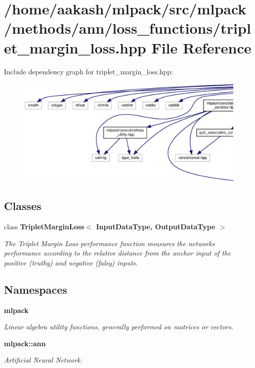 \section{/home/aakash/mlpack/src/mlpack/methods/ann/loss\+\_\+functions/triplet\+\_\+margin\+\_\+loss.hpp File Reference}
\label{triplet__margin__loss_8hpp}
Include dependency graph for triplet\+\_\+margin\+\_\+loss.\+hpp\+:
\nopagebreak
\begin{figure}[H]
\begin{center}
\leavevmode
\includegraphics[width=350pt]{triplet__margin__loss_8hpp__incl}
\end{center}
\end{figure}
\subsection*{Classes}
\begin{DoxyCompactItemize}
\item 
class \textbf{ Triplet\+Margin\+Loss$<$ Input\+Data\+Type, Output\+Data\+Type $>$}
\begin{DoxyCompactList}\small\item\em The Triplet Margin Loss performance function measures the network\textquotesingle{}s performance according to the relative distance from the anchor input of the positive (truthy) and negative (falsy) inputs. \end{DoxyCompactList}\end{DoxyCompactItemize}
\subsection*{Namespaces}
\begin{DoxyCompactItemize}
\item 
 \textbf{ mlpack}
\begin{DoxyCompactList}\small\item\em Linear algebra utility functions, generally performed on matrices or vectors. \end{DoxyCompactList}\item 
 \textbf{ mlpack\+::ann}
\begin{DoxyCompactList}\small\item\em Artificial Neural Network. \end{DoxyCompactList}\end{DoxyCompactItemize}


